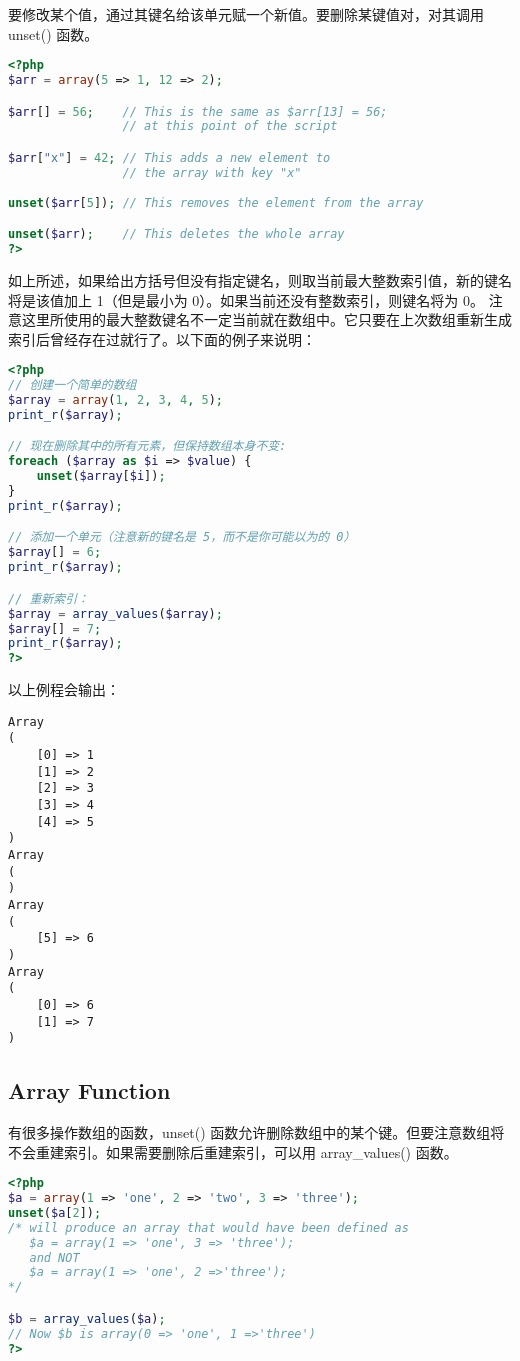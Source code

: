 要修改某个值，通过其键名给该单元赋一个新值。要删除某键值对，对其调用 unset() 函数。


\begin{lstlisting}[language=PHP]
<?php
$arr = array(5 => 1, 12 => 2);

$arr[] = 56;    // This is the same as $arr[13] = 56;
                // at this point of the script

$arr["x"] = 42; // This adds a new element to
                // the array with key "x"
                
unset($arr[5]); // This removes the element from the array

unset($arr);    // This deletes the whole array
?>
\end{lstlisting}

如上所述，如果给出方括号但没有指定键名，则取当前最大整数索引值，新的键名将是该值加上 1（但是最小为 0）。如果当前还没有整数索引，则键名将为 0。
注意这里所使用的最大整数键名不一定当前就在数组中。它只要在上次数组重新生成索引后曾经存在过就行了。以下面的例子来说明：

\begin{lstlisting}[language=PHP]
<?php
// 创建一个简单的数组
$array = array(1, 2, 3, 4, 5);
print_r($array);

// 现在删除其中的所有元素，但保持数组本身不变:
foreach ($array as $i => $value) {
    unset($array[$i]);
}
print_r($array);

// 添加一个单元（注意新的键名是 5，而不是你可能以为的 0）
$array[] = 6;
print_r($array);

// 重新索引：
$array = array_values($array);
$array[] = 7;
print_r($array);
?>
\end{lstlisting}

以上例程会输出：


\begin{verbatim}
Array
(
    [0] => 1
    [1] => 2
    [2] => 3
    [3] => 4
    [4] => 5
)
Array
(
)
Array
(
    [5] => 6
)
Array
(
    [0] => 6
    [1] => 7
)
\end{verbatim}

\subsection{Array Function}

有很多操作数组的函数，unset() 函数允许删除数组中的某个键。但要注意数组将不会重建索引。如果需要删除后重建索引，可以用 array\_values() 函数。

\begin{lstlisting}[language=PHP]
<?php
$a = array(1 => 'one', 2 => 'two', 3 => 'three');
unset($a[2]);
/* will produce an array that would have been defined as
   $a = array(1 => 'one', 3 => 'three');
   and NOT
   $a = array(1 => 'one', 2 =>'three');
*/

$b = array_values($a);
// Now $b is array(0 => 'one', 1 =>'three')
?>
\end{lstlisting}

